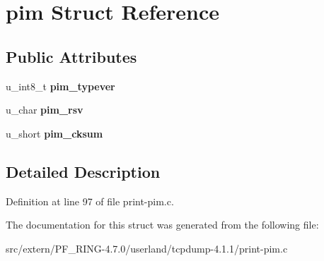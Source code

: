 \hypertarget{structpim}{
\section{pim Struct Reference}
\label{structpim}
}
\subsection*{Public Attributes}
\begin{DoxyCompactItemize}
\item 
\hypertarget{structpim_a58436d992bd710d36ace2129b52c6409}{
u\_\-int8\_\-t {\bfseries pim\_\-typever}}
\label{structpim_a58436d992bd710d36ace2129b52c6409}

\item 
\hypertarget{structpim_a131a271a581110c66125297b294fde39}{
u\_\-char {\bfseries pim\_\-rsv}}
\label{structpim_a131a271a581110c66125297b294fde39}

\item 
\hypertarget{structpim_a625bcb7b85bb055c2abf9d2558797c95}{
u\_\-short {\bfseries pim\_\-cksum}}
\label{structpim_a625bcb7b85bb055c2abf9d2558797c95}

\end{DoxyCompactItemize}


\subsection{Detailed Description}


Definition at line 97 of file print-\/pim.c.



The documentation for this struct was generated from the following file:\begin{DoxyCompactItemize}
\item 
src/extern/PF\_\-RING-\/4.7.0/userland/tcpdump-\/4.1.1/print-\/pim.c\end{DoxyCompactItemize}
